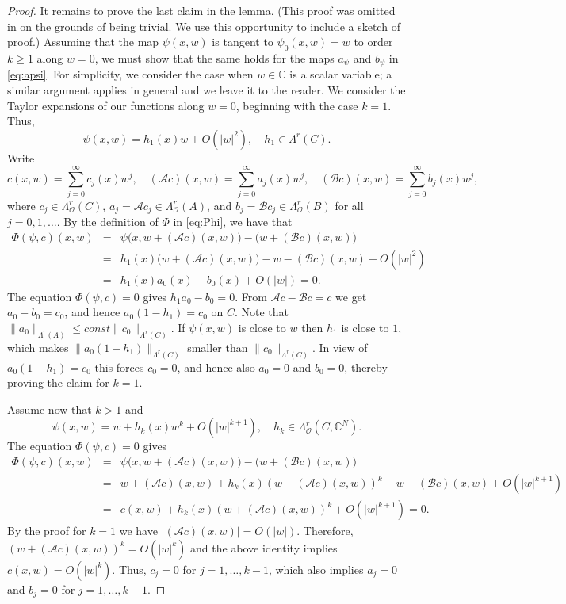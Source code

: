 \documentclass[11pt]{amsart}
\numberwithin{equation}{section}
\theoremstyle{definition}
\newcommand\Acal{\mathcal{A}}
\newcommand\Bcal{\mathcal{B}}
\newcommand\Oscr{\mathscr{O}}
\newcommand\C{\mathbb{C}}
\begin{document}
\begin{proof}
It remains to prove the last claim in the lemma.
(This proof was omitted in \cite[Proposition 5.8.1]{Forstneric2017E} 
on the grounds of being trivial. 
We use this opportunity to include a sketch of proof.)
Assuming that the map $\psi(x,w)$ is tangent to $\psi_0(x,w)=w$ 
to order $k\ge 1$ along $w=0$, we must show that the same holds 
for the maps $a_\psi$ and $b_\psi$ in \eqref{eq:apsi}.
For simplicity, we consider the case when $w\in \C$ is a scalar variable;
a similar argument applies in general and we leave it to the reader.
We consider the Taylor expansions of our functions along $w=0$,
beginning with the case $k=1$. Thus, 
\[
	\psi(x,w)=h_1(x) w + O(|w|^2),\quad h_1\in \Lambda^r(C).
\]
Write 
\[
	c(x,w)          = \sum_{j=0}^\infty c_j(x)w^j, \quad 
	(\Acal c)(x,w) = \sum_{j=0}^\infty a_j(x)w^j, \quad
	(\Bcal c)(x,w) = \sum_{j=0}^\infty b_j(x)w^j, 
\]
where $c_j\in \Lambda^r_\Oscr(C)$, 
$a_j=\Acal c_j \in \Lambda^r_\Oscr(A)$, 
and $b_j=\Bcal c_j \in \Lambda^r_\Oscr(B)$ for all $j=0,1,\ldots$.
By the definition of $\Phi$ in \eqref{eq:Phi}, we have that 
\begin{eqnarray*}
	\Phi(\psi,c)(x,w) &=& 
	\psi\bigl(x,w+(\Acal c)(x,w)\bigr) - \bigl(w+(\Bcal c)(x,w)\bigr) \\
	&=&  h_1(x) \bigl(w+(\Acal c)(x,w)\bigr) - w - (\Bcal c)(x,w) + O(|w|^2)\\
	&=&  h_1(x) a_0(x) - b_0(x) + O(|w|) =0. 
\end{eqnarray*}
The equation $\Phi(\psi,c)=0$ gives $h_1a_0 -b_0=0$.
From $\Acal c-\Bcal c=c$ we get $a_0-b_0=c_0$, and hence 
$a_0(1-h_1)=c_0$ on $C$. Note that 
$\|a_0\|_{\Lambda^r(A)} \le const \|c_0\|_{\Lambda^r(C)}$. If 
$\psi(x,w)$ is close to $w$ then $h_1$ is close to $1$, which 
makes $\|a_0(1-h_1)\|_{\Lambda^r(C)}$ smaller than 
$\|c_0\|_{\Lambda^r(C)}$. In view of $a_0(1-h_1)=c_0$  
this forces $c_0=0$, and hence also $a_0=0$ and $b_0=0$, 
thereby proving the claim for $k=1$.

Assume now that $k>1$ and 
\[
	\psi(x,w)=w+ h_k(x) w^k + O(|w|^{k+1}),\quad 
	h_k\in\Lambda^r_\Oscr(C,\C^N). 
\]
The equation $\Phi(\psi,c)=0$ gives 
\begin{eqnarray*}
	\Phi(\psi,c)(x,w) &=& 
	\psi\bigl(x,w+(\Acal c)(x,w)\bigr) - \bigl(w+(\Bcal c)(x,w)\bigr) \\
	&=&  w+(\Acal c)(x,w) + h_k(x)(w+(\Acal c)(x,w))^k  
		- w - (\Bcal c)(x,w) + O(|w|^{k+1}) \\
	&=&  c(x,w) + h_k(x)(w+(\Acal c)(x,w))^k  + O(|w|^{k+1}) =0. 
\end{eqnarray*}
By the proof for $k=1$ we have $|(\Acal c)(x,w)|=O(|w|)$.
Therefore, $(w+(\Acal c)(x,w))^k=O(|w|^k)$ and the above identity
implies $c(x,w)=O(|w|^k)$. Thus, $c_j=0$ for $j=1,\ldots, k-1$, 
which also implies $a_j=0$ and $b_j=0$ for $j=1,\ldots, k-1$. 
\end{proof}
\end{document}
